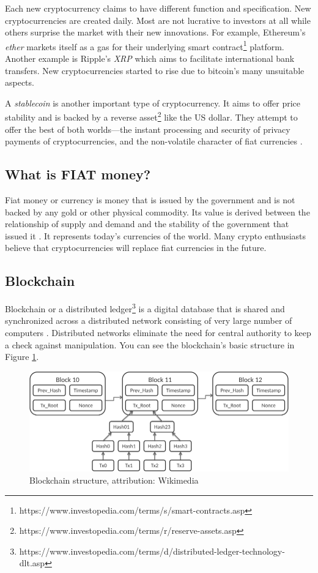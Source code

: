 Each new cryptocurrency claims to have different function and specification. New cryptocurrencies are created daily. Most are not lucrative to investors at all while others surprise the market with their new innovations. For example, Ethereum's \emph{ether} markets itself as a gas for their underlying smart contract\footnote{https://www.investopedia.com/terms/s/smart-contracts.asp} platform. Another example is Ripple's \emph{XRP} which aims to facilitate international bank transfers. New cryptocurrencies started to rise due to bitcoin's many unsuitable aspects.

\label{stablecoins-ref}
A \emph{stablecoin} is another important type of cryptocurrency. It aims to offer price stability and is backed by a reverse asset\footnote{https://www.investopedia.com/terms/r/reserve-assets.asp} like the US dollar. They attempt to offer the best of both worlds---the instant processing and security of privacy payments of cryptocurrencies, and the non-volatile character of fiat currencies \cite{investopedia-stablecoin}.

\subsection*{What is FIAT money?}
﻿Fiat money or currency is money that is issued by the government and is not backed by any gold or other physical commodity. Its value is derived between the relationship of supply and demand and the stability of the government that issued it \cite{investopedia-fiat}. It represents today's currencies of the world. Many crypto enthusiasts believe that cryptocurrencies will replace fiat currencies in the future.

\subsection*{Blockchain}
\label{blockchain}
Blockchain or a distributed ledger\footnote{https://www.investopedia.com/terms/d/distributed-ledger-technology-dlt.asp} is a digital database that is shared and synchronized across a distributed network consisting of very large number of computers \cite{investopedia-blockchain}. Distributed networks eliminate the need for central authority to keep a check against manipulation. You can see the blockchain's basic structure in Figure \ref{blockchain-figure}.

\begin{figure}[ht]
    \centering
    \includegraphics[width=\columnwidth]{figures/Bitcoin_Block_Data.png}
    \caption{Blockchain structure, attribution: Wikimedia}
    \label{blockchain-figure}
\end{figure}

